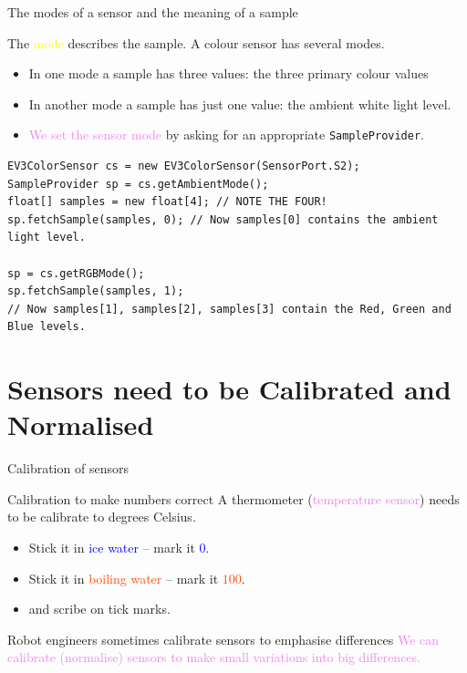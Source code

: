 \documentclass[color=pdftex,usenames,dvipsnames, aspectratio=169]{beamer}
\begin{document}
\begin{frame}[fragile]{The modes of a sensor and the meaning of a sample}
\begin{block}{The \textcolor{yellow}{mode} describes the sample.  A colour sensor has several modes.}
\begin{itemize}
  \item In one mode a sample has three values: \alert{the three primary colour values}
  \item In another mode a sample has just one value: \alert{the ambient white light level}.
   \item \textcolor{violet}{We set the sensor mode} by asking for an appropriate \lstinline!SampleProvider!.
\end{itemize}
\end{block}
\center\begin{lstlisting}[emph={getRGBMode,getAmbientMode,samples},linewidth=1.03\textwidth,basicstyle=\ttfamily\footnotesize\color{blue}]
EV3ColorSensor cs = new EV3ColorSensor(SensorPort.S2);
SampleProvider sp = cs.getAmbientMode();
float[] samples = new float[4]; // NOTE THE FOUR!
sp.fetchSample(samples, 0); // Now samples[0] contains the ambient light level.

sp = cs.getRGBMode();
sp.fetchSample(samples, 1);
// Now samples[1], samples[2], samples[3] contain the Red, Green and Blue levels.
\end{lstlisting}
\end{frame}


\section*{Sensors need to be Calibrated and Normalised}

\begin{frame}{Calibration of sensors}
\begin{block}{Calibration to make numbers correct}
A thermometer (\textcolor{violet}{temperature sensor}) needs to be calibrate to degrees Celsius.
\begin{itemize}
\item Stick it in \textcolor{blue}{ice water} -- mark it \textcolor{blue}{$0$}.
\item Stick it in \textcolor{OrangeRed}{boiling water} -- mark it \textcolor{OrangeRed}{$100$}.
\item \color{teal}{Divide the distance by 100} and scribe on tick marks.
\end{itemize}
\end{block}

\begin{block}{Robot engineers sometimes calibrate sensors to emphasise differences}
\textcolor{violet}{We can calibrate (normalise) sensors to make small variations into big differences.}
\end{block}
\end{frame}
\end{document}
